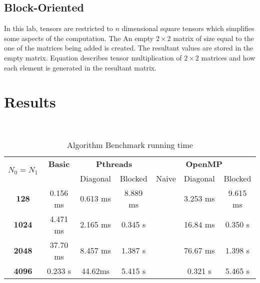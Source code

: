 \documentclass[10pt,journal]{article}
\begin{document}
\subsection{Block-Oriented}
In this lab, tensors are restricted to $n$ dimensional square tensors which simplifies some aspects of the computation. The An empty  $2\times 2$ matrix of size equal to the one of the matrices being added is created. The resultant values are stored in the empty matrix. Equation describes tensor multiplication of  $2\times 2$ matrices and how each element is generated in the resultant matrix.


\section{Results}\

\begin{table}[]
\caption{\label{tab:table-name}Algorithm Benchmark running time}
\begin{tabular}{|c|c|c|c|c|c|c|}

\hline

\multirow{2}{*}{\textbf{$N_{0}=N_{1}$}} & \textbf{Basic} & \multicolumn{2}{c|}{\textbf{Pthreads}} & \multicolumn{3}{c|}{\textbf{OpenMP}} \\ \cline{2-7} 
                                    &                & Diagonal           & Blocked           & Naive       & Diagonal            & Blocked           \\ \hline
\textbf{128}                        & 0.156 ms       & 0.613 ms           & 8.889 ms          &             & 3.253 ms            & 9.615 ms          \\ \hline
\textbf{1024}                       & 4.471 ms       & 2.165 ms           & 0.345 s          &             & 16.84 ms            & 0.350 s          \\ \hline
\textbf{2048}                       & 37.70 ms       & 8.457 ms           & 1.387 s           &             & 76.67 ms            & 1.398 s           \\ \hline
\textbf{4096}                       & 0.233 s        & 44.62ms            & 5.415 s           &             & 0.321 s             & 5.465 s           \\ \hline
\end{tabular}
\end{table}
\end{document}
